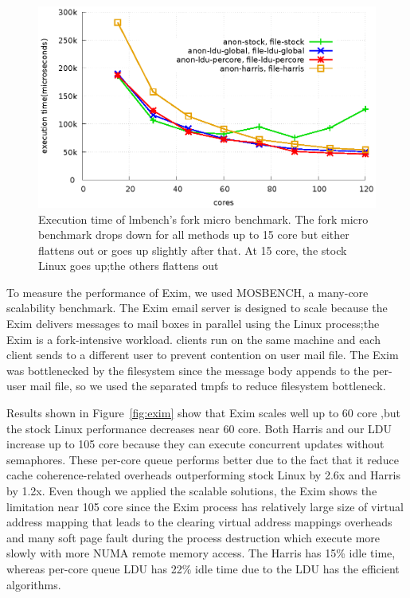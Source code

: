 \begin{figure}[tb]
  \begin{center}
    \includegraphics[scale=0.65]{graph/lmbench.eps}
  \end{center}
  \caption{Execution time of lmbench's fork micro benchmark. The fork micro
  benchmark drops down for all methods up to 15 core but either flattens out or
  goes up slightly after that. At 15 core, the stock Linux goes up;the others
  flattens out}
  \label{fig:MicroBench}
\end{figure}



To measure the performance of Exim, we used MOSBENCH, a many-core
scalability benchmark.
The Exim email server is designed to scale because the Exim delivers messages to
mail boxes in parallel using the Linux process;the Exim is a fork-intensive
workload.
clients run on the same machine and each client sends to a different user to
prevent contention on user mail file.
The Exim was bottlenecked by the filesystem since the message body appends to
the per-user mail file, so we used the separated tmpfs to reduce filesystem
bottleneck.

Results shown in Figure~\ref{fig:exim} show that Exim scales well up to 60 core
,but the stock Linux performance decreases near 60 core.
Both Harris and our LDU increase up to 105 core because they can execute
concurrent updates without semaphores.
These per-core queue performs better due to the fact that it reduce
cache coherence-related overheads outperforming stock Linux by 2.6x and Harris
by 1.2x.
Even though we applied the scalable solutions, the Exim shows the limitation
near 105 core since the Exim process has relatively large size of virtual
address mapping that leads to the clearing virtual address mappings overheads
and many soft page fault during the process destruction which execute more
slowly with more NUMA remote memory access.
The Harris has 15\% idle time, whereas per-core queue LDU
has 22\% idle time due to the LDU has the efficient algorithms.

